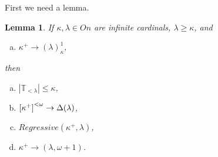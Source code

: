 \documentclass[a4paper,10pt,reqno]{amsart}
\numberwithin{equation}{section}
\newtheorem{lemma}[theorem]{Lemma}
\theoremstyle{definition}
\theoremstyle{remark}
\newcommand{\mbb}[1]{\mathbb{#1}}
\begin{document}
First we need a lemma. 



\begin{lemma}\label{lm:4in1}\label{lm:cf2trww}
    If ${\kappa},{\lambda}\in On $  are infinite cardinals, ${\lambda}\ge {\kappa}$, 
    and 
    \begin{enumerate}[(a)]
      \item   ${\kappa}^+\to ({\lambda})^1_{\kappa}$,
    \end{enumerate} 
    then 
    \begin{enumerate}[(a)]\addtocounter{enumi}{1}
        \item     $|\mbb T_{<{\lambda}}|\le {\kappa}$, 
        \item     ${[{\kappa}^+]}^{<{\omega}}\to \Delta({\lambda})$,
\item $Regressive({\kappa}^+,{\lambda})$,

\item ${\kappa}^+\to ({\lambda},{\omega}+1)$.
    \end{enumerate}
\end{lemma}
\end{document}
